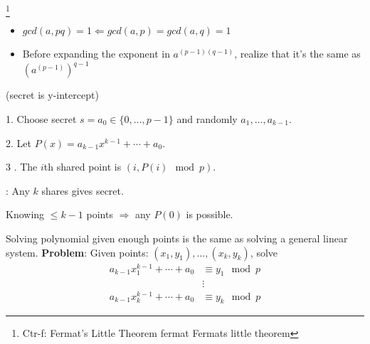 \documentclass[12pt]{article}
\newcommand{\myspace}{\vspace{2\bigskipamount}}
\newcommand\p{\Needspace{12\baselineskip} \noindent}
\begin{document}
\p {}\footnote{Ctr-f: Fermat's Little Theorem fermat Fermats little theorem}
\begin{itemize} 
	\item $gcd(a, pq) = 1 \Leftarrow gcd(a, p) = gcd(a, q) = 1$
	\item Before expanding the exponent in $a^{(p-1)(q-1)}$, realize that it's the same as $(a^{(p-1)})^{q-1}$
\end{itemize}





 
\begin{compactitem}[$\rightarrow$]
\item {}
\item {}
\end{compactitem}
 
\myspace
\p {} (secret is y-intercept)
	\begin{compactitem}
		\item[1.] Choose secret $s = a_0  \in \{0, \ldots, p-1 \}$ and randomly $a_1, \ldots, a_{k-1}$. 
		\item[2.] Let $P(x) = a_{k -1} x^{k-1} + \cdots + a_0$. 
		\item[3]. The $i$th shared point is $(i, P(i) \mod{p})$. 
		\item {}: Any $k$ shares gives secret.
		\item {} Knowing $\le k-1$ points $\Rightarrow$ any $P(0)$ is possible.
	\end{compactitem}

Solving polynomial given enough points is the same as solving a general linear system. \textbf{Problem}: Given points: $(x_1, y_1), \ldots, (x_k, y_k)$, solve\textellipsis
\begin{align}
	a_{k-1}x_1^{k-1} + \cdots + a_0 &\equiv y_1 \mod{p} \\
	&\vdots\\
	a_{k-1}x_k^{k-1} + \cdots + a_0 &\equiv y_k \mod{p}
\end{align}
\end{document}
